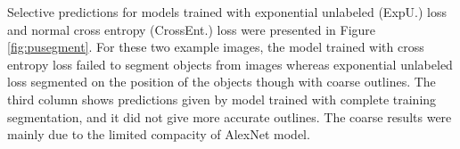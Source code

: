 \noindent
Selective predictions for models trained with exponential unlabeled (ExpU.) loss and normal cross entropy (CrossEnt.) loss were presented in Figure \ref{fig:pusegment}.
For these two example images, the model trained with cross entropy loss failed to segment objects from images whereas exponential unlabeled loss segmented on the position of the objects though with coarse outlines.
The third column shows predictions given by model trained with complete training segmentation, and it did not give more accurate outlines.
The coarse results were mainly due to the limited compacity of AlexNet model.

\begin{figure}
\centering
  \begin{minipage}{\columnwidth}\footnotesize
  \centering

\end{minipage}
\end{figure}
